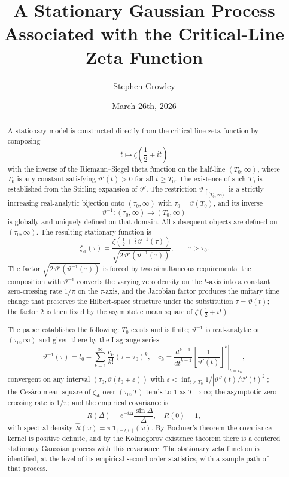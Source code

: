 \documentclass[11pt]{article}
\title{A Stationary Gaussian Process Associated with the Critical-Line Zeta Function}
\author{Stephen Crowley}
\date{March 26th, 2026}
\numberwithin{equation}{section}
\theoremstyle{plain}
\theoremstyle{definition}
\begin{document}
\maketitle

\begin{abstract}
A stationary model is constructed directly from the critical-line zeta function by composing
\[
t \longmapsto \zeta\!\left(\frac12+it\right)
\]
with the inverse of the Riemann--Siegel theta function on the half-line
\((T_0,\infty)\), where \(T_0\) is any constant satisfying \(\vartheta'(t)>0\) for all
\(t\ge T_0\). The existence of such \(T_0\) is established from the Stirling expansion
of \(\vartheta'\). The restriction \(\vartheta\restriction_{[T_0,\infty)}\) is a strictly
increasing real-analytic bijection onto \((\tau_0,\infty)\) with
\(\tau_0=\vartheta(T_0)\), and its inverse
\[
\vartheta^{-1}:(\tau_0,\infty)\to(T_0,\infty)
\]
is globally and uniquely defined on that domain. All subsequent objects are defined
on \((\tau_0,\infty)\). The resulting stationary function is
\[
\zeta_{\mathrm{st}}(\tau)
=
\frac{\zeta\!\left(\frac12+i\,\vartheta^{-1}(\tau)\right)}
{\sqrt{2\,\vartheta'(\vartheta^{-1}(\tau))}},
\qquad \tau>\tau_0.
\]
The factor \(\sqrt{2\,\vartheta'(\vartheta^{-1}(\tau))}\) is forced by two simultaneous
requirements: the composition with \(\vartheta^{-1}\) converts the varying zero density
on the \(t\)-axis into a constant zero-crossing rate \(1/\pi\) on the \(\tau\)-axis,
and the Jacobian factor produces the unitary time change that preserves the Hilbert-space
structure under the substitution \(\tau=\vartheta(t)\); the factor \(2\) is then fixed
by the asymptotic mean square of \(\zeta(\tfrac12+it)\).

The paper establishes the following: \(T_0\) exists and is finite; \(\vartheta^{-1}\) is
real-analytic on \((\tau_0,\infty)\) and given there by the Lagrange series
\[
\vartheta^{-1}(\tau)=t_0+\sum_{k=1}^\infty\frac{c_k}{k!}(\tau-\tau_0)^k,
\quad
c_k=\left.\frac{d^{k-1}}{dt^{k-1}}\left[\frac{1}{\vartheta'(t)}\right]^k\right|_{t=t_0},
\]
convergent on any interval \((\tau_0,\vartheta(t_0+\varepsilon))\) with
\(\varepsilon<\inf_{t\ge T_0}1/|\vartheta''(t)/\vartheta'(t)^2|\);
the Ces\`aro mean square of \(\zeta_{\mathrm{st}}\) over \((\tau_0,T)\) tends to \(1\)
as \(T\to\infty\); the asymptotic zero-crossing rate is \(1/\pi\); and the empirical
covariance is
\[
R(\Delta)=e^{-i\Delta}\frac{\sin\Delta}{\Delta},
\quad R(0)=1,
\]
with spectral density \(\widehat{R}(\omega)=\pi\,\mathbf{1}_{[-2,0]}(\omega)\).
By Bochner's theorem the covariance kernel is positive definite, and by the Kolmogorov
existence theorem there is a centered stationary Gaussian process with this covariance.
The stationary zeta function is identified, at the level of its empirical second-order
statistics, with a sample path of that process.
\end{abstract}
\end{document}
